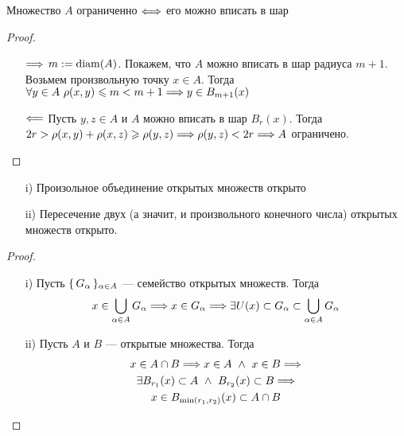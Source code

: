 \begin{theorem}
    Множество $A$ ограниченно $\Longleftrightarrow$ его можно вписать в шар
\end{theorem}
\begin{proof}
    \enewline
    \begin{itemize}
        \item[$\Longrightarrow$] $m := \operatorname{diam}(A)$. Покажем, что $A$ можно вписать в
        шар радиуса $m + 1$. Возьмем произвольную точку $x \in A$. Тогда
        $\forall y \in A~\rho(x, y) \leqslant m < m + 1 \Longrightarrow y \in B_{m+1}(x)$
        \item[$\Longleftarrow$] Пусть $y, z \in A$ и $A$ можно вписать в шар $B_r(x)$.
        Тогда $2r > \rho(x, y) + \rho(x, z) \geqslant \rho(y, z) \Longrightarrow \rho(y, z)
        < 2r \Longrightarrow A$ ограничено.
    \end{itemize}
\end{proof}

\begin{theorem}
    \enewline
    \begin{itemize}
        \item[i)] Произольное объединение открытых множеств открыто
        \item[ii)] Пересечение двух (а значит, и произвольного конечного числа)
        открытых множеств открыто.
    \end{itemize}
\end{theorem}
\begin{proof}
    \enewline
    \begin{itemize}
        \item[i)] Пусть $\{\, G_\alpha \,\}_{\alpha \in A}$ --- семейство открытых множеств. Тогда
        \begin{gather*}
            x \in \bigcup_{\alpha \in A}{G_\alpha} \Longrightarrow x \in G_\alpha \Longrightarrow \exists U(x)
            \subset G_\alpha \subset \bigcup_{\alpha \in A}{G_\alpha}
        \end{gather*}
        \item[ii)] Пусть $A$ и $B$ --- открытые множества. Тогда
        \begin{gather*}
            x \in A \cap B \Longrightarrow x \in A ~\wedge~ x \in B \Longrightarrow \\
            \exists B_{r_1}(x) \subset A ~\wedge~ B_{r_2}(x) \subset B \Longrightarrow \\
            x \in B_{\min(r_1, r_2)}(x) \subset A \cap B
        \end{gather*}
    \end{itemize}
\end{proof}

